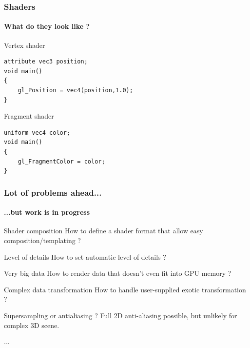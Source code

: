 \documentclass[10pt]{beamer}
\begin{document}
\begin{frame}[fragile]
  \frametitle{Shaders}
  \framesubtitle{What do they look like ?}

  \begin{block}{Vertex shader}
    \begin{lstlisting}
attribute vec3 position;
void main()
{
    gl_Position = vec4(position,1.0);
}
    \end{lstlisting}
  \end{block}

  \begin{block}{Fragment shader}
    \begin{lstlisting}
uniform vec4 color;
void main()
{
    gl_FragmentColor = color;
}
    \end{lstlisting}
  \end{block}
\end{frame}




\begin{frame}
  \frametitle{Lot of problems ahead...}
  \framesubtitle{...but work is in progress}

  \begin{block}{Shader composition}
    How to define a shader format that allow easy composition/templating ?
  \end{block}

  \begin{block}{Level of details}
    How to set automatic level of details ?
  \end{block}

  \begin{block}{Very big data}
    How to render data that doesn't even fit into GPU memory ?
  \end{block}

  \begin{block}{Complex data transformation}
    How to handle user-supplied exotic transformation ?
  \end{block}

  \begin{block}{Supersampling or antialiasing ?}
    Full 2D anti-aliasing possible, but unlikely for complex 3D scene.
  \end{block}

  \begin{block}{...}
  \end{block}

\end{frame}
\end{document}
